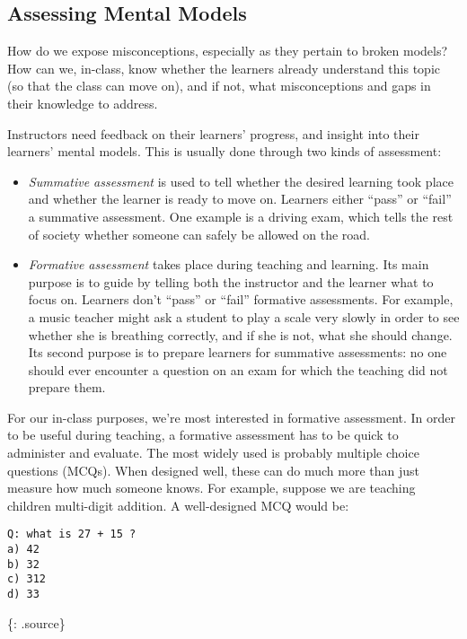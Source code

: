 \subsection{Assessing Mental Models}\label{assessing-mental-models}

How do we expose misconceptions, especially as they pertain to broken
models? How can we, in-class, know whether the learners already
understand this topic (so that the class can move on), and if not, what
misconceptions and gaps in their knowledge to address.

Instructors need feedback on their learners' progress, and insight into
their learners' mental models. This is usually done through two kinds of
assessment:

\begin{itemize}
\item
  \emph{Summative assessment} is used to tell whether the desired
  learning took place and whether the learner is ready to move on.
  Learners either ``pass'' or ``fail'' a summative assessment. One
  example is a driving exam, which tells the rest of society whether
  someone can safely be allowed on the road.
\item
  \emph{Formative assessment} takes place during teaching and learning.
  Its main purpose is to guide by telling both the instructor and the
  learner what to focus on. Learners don't ``pass'' or ``fail''
  formative assessments. For example, a music teacher might ask a
  student to play a scale very slowly in order to see whether she is
  breathing correctly, and if she is not, what she should change. Its
  second purpose is to prepare learners for summative assessments: no
  one should ever encounter a question on an exam for which the teaching
  did not prepare them.
\end{itemize}

For our in-class purposes, we're most interested in formative
assessment. In order to be useful during teaching, a formative
assessment has to be quick to administer and evaluate. The most widely
used is probably multiple choice questions (MCQs). When designed well,
these can do much more than just measure how much someone knows. For
example, suppose we are teaching children multi-digit addition. A
well-designed MCQ would be:

\begin{verbatim}
Q: what is 27 + 15 ?
a) 42
b) 32
c) 312
d) 33
\end{verbatim}

\{: .source\}

